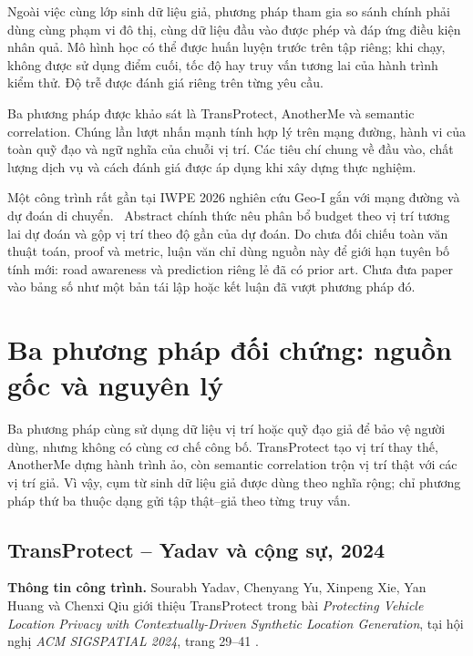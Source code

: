 \documentclass[12pt,a4paper,oneside]{report}
\begin{document}
Ngoài việc cùng lớp sinh dữ liệu giả, phương pháp tham gia so sánh chính phải dùng cùng phạm vi đô thị, cùng dữ liệu đầu vào được phép và đáp ứng điều kiện nhân quả. Mô hình học có thể được huấn luyện trước trên tập riêng; khi chạy, không được sử dụng điểm cuối, tốc độ hay truy vấn tương lai của hành trình kiểm thử. Độ trễ được đánh giá riêng trên từng yêu cầu.

Ba phương pháp được khảo sát là TransProtect, AnotherMe và semantic correlation. Chúng lần lượt nhấn mạnh tính hợp lý trên mạng đường, hành vi của toàn quỹ đạo và ngữ nghĩa của chuỗi vị trí. Các tiêu chí chung về đầu vào, chất lượng dịch vụ và cách đánh giá được áp dụng khi xây dựng thực nghiệm.

Một công trình rất gần tại IWPE 2026 nghiên cứu Geo-I gắn với mạng đường và dự đoán di chuyển.~\citep{santos2026road} Abstract chính thức nêu phân bổ budget theo vị trí tương lai dự đoán và gộp vị trí theo độ gần của dự đoán. Do chưa đối chiếu toàn văn thuật toán, proof và metric, luận văn chỉ dùng nguồn này để giới hạn tuyên bố tính mới: road awareness và prediction riêng lẻ đã có prior art. Chưa đưa paper vào bảng số như một bản tái lập hoặc kết luận đã vượt phương pháp đó.

\clearpage
\section{Ba phương pháp đối chứng: nguồn gốc và nguyên lý}
\label{sec:comparator-rationale}

Ba phương pháp cùng sử dụng dữ liệu vị trí hoặc quỹ đạo giả để bảo vệ người dùng, nhưng không có cùng cơ chế công bố. TransProtect tạo vị trí thay thế, AnotherMe dựng hành trình ảo, còn semantic correlation trộn vị trí thật với các vị trí giả. Vì vậy, cụm từ sinh dữ liệu giả được dùng theo nghĩa rộng; chỉ phương pháp thứ ba thuộc dạng gửi tập thật--giả theo từng truy vấn.

\subsection{TransProtect -- Yadav và cộng sự, 2024}

\noindent\textbf{Thông tin công trình.}
Sourabh Yadav, Chenyang Yu, Xinpeng Xie, Yan Huang và Chenxi Qiu giới thiệu TransProtect trong bài \emph{Protecting Vehicle Location Privacy with Contextually-Driven Synthetic Location Generation}, tại hội nghị \emph{ACM SIGSPATIAL 2024}, trang 29--41 \citep{yadav2024transprotect}.
\end{document}
